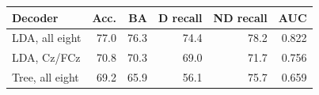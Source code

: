 \begin{tabular}{@{}lrrrrr@{}}
\toprule
Decoder & Acc. & BA & D recall & ND recall & AUC \\
\midrule
LDA, all eight & 77.0 & 76.3 & 74.4 & 78.2 & 0.822 \\
LDA, Cz/FCz & 70.8 & 70.3 & 69.0 & 71.7 & 0.756 \\
Tree, all eight & 69.2 & 65.9 & 56.1 & 75.7 & 0.659 \\
\bottomrule
\end{tabular}
